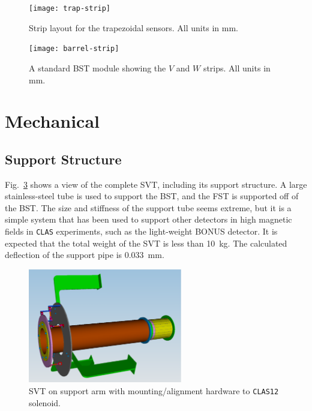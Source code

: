 \begin{figure}[htbp]
\centering
\texttt{[image: trap-strip]}
\caption{\small{Strip layout for the trapezoidal sensors. All units 
in mm.}}
\label{fig:trap-strip}
\end{figure}

\begin{figure}[htbp]
\centering
\texttt{[image: barrel-strip]}
\caption{\small{A standard BST module showing the $V$ and $W$ strips.
All units in mm.}}
\label{barrel_strip}
\end{figure}

\section{Mechanical}

\subsection{Support Structure}

Fig.~\ref{svt_support} shows a view of the complete SVT, including its 
support structure.  A large stainless-steel tube is used to support the BST, 
and the FST is supported off of the BST.   The size and stiffness of the 
support tube seems extreme, but it is a simple system that has been used to 
support other detectors in high magnetic fields in {\tt CLAS} experiments, 
such as the light-weight BONUS detector.   It is expected that the total 
weight of the SVT is less than 10~kg. The calculated deflection of the 
support pipe is 0.033~mm.

\begin{figure}[htbp]
\centering
\includegraphics[width=0.60\textwidth]{dave_fig5}
\caption{\small{SVT on support arm with mounting/alignment hardware to
{\tt CLAS12} solenoid.}}
\label{svt_support}
\end{figure}

